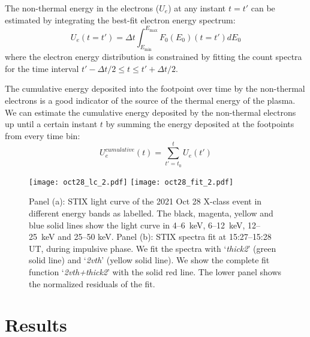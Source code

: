 The non-thermal energy in the electrons (\( U_{e} \)) at any instant \( t = t' \) can be estimated by integrating the best-fit electron energy spectrum:
\[
U_{e}(t=t') = \Delta t \int_{E_{\text{min}}}^{E_{\text{max}}} F_{0}(E_{0})(t=t') dE_{0}
\]
where the electron energy distribution is constrained by fitting the count spectra for the time interval \( t' - \Delta t/2 \leq t \leq t' + \Delta t/2 \).

The cumulative energy deposited into the footpoint over time by the non-thermal electrons is a good indicator of the source of the thermal energy of the plasma. We can estimate the cumulative energy deposited by the non-thermal electrons up until a certain instant \( t \) by summing the energy deposited at the footpoints from every time bin:
\[
U^{cumulative}_{e}(t) = \sum_{t'=t_{0}}^{t} U_{e}(t')
\]

\begin{figure}[ht!]
    \centering
    \texttt{[image: oct28\_lc\_2.pdf]} 
    \texttt{[image: oct28\_fit\_2.pdf]}
    \caption{Panel (a): STIX light curve of the 2021 Oct 28 X-class event in different energy bands as labelled. The black, magenta, yellow and blue solid lines show the light curve in 4{--}6~keV, 6{--}12~keV, 12{--}25~keV and 25{--}50 keV. Panel (b): STIX spectra fit at 15:27{--}15:28 UT, during impulsive phase. We fit the spectra with `\textit{thick2}' (green solid line) and `\textit{2vth}' (yellow solid line). We show the complete fit function `\textit{2vth+thick2}' with the solid red line. The lower panel shows the normalized residuals of the fit.}
    \label{fig:stix_an}
    \end{figure}

\section{Results}\label{res}

